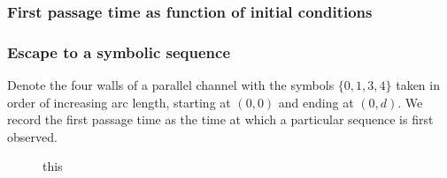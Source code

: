 \documentclass[a4paper,12pt]{article}
\begin{document}


\clearpage
\subsubsection{First passage time as function of initial conditions}

\clearpage
\subsubsection{Escape to a symbolic sequence}
Denote the four walls of a parallel channel with the symbols $\{ 0,1,3,4 \}$ taken in order of increasing arc length, starting at $(0, 0)$ and ending at $(0, d)$. We record the first passage time as the time at which a particular sequence is first observed.


\begin{figure}
    \centering
\caption{this}
\end{figure}
\end{document}
